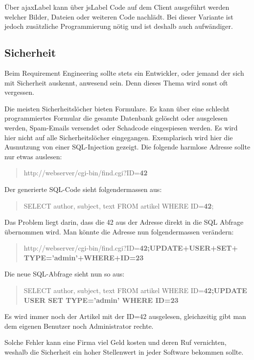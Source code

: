 Über \gls{ajaxLabel} kann über \gls{jsLabel} Code auf dem Client ausgeführt werden welcher Bilder, Dateien oder weiteren Code nachlädt. Bei dieser Variante ist jedoch zusätzliche Programmierung nötig und ist deshalb auch aufwändiger. 

\subsection{Sicherheit}
Beim Requirement Engineering sollte stets ein Entwickler, oder jemand der sich mit Sicherheit auskennt, anwesend sein. Denn dieses Thema wird sonst oft vergessen.

Die meisten Sicherheitslöcher bieten Formulare. Es kann über eine schlecht programmiertes Formular die gesamte Datenbank gelöscht oder ausgelesen werden, Spam-Emails versendet oder Schadcode eingespiesen werden.
Es wird hier nicht auf alle Sicherheitslöcher eingegangen. Exemplarisch wird hier die Ausnutzung von einer SQL-Injection gezeigt. Die folgende harmlose Adresse sollte nur etwas auslesen:

\begin{quote}
http://webserver/cgi-bin/find.cgi?ID=\textbf{42}
\end{quote}

Der generierte SQL-Code sieht folgendermassen aus:

\begin{quote}
SELECT author, subject, text FROM artikel WHERE ID=\textbf{42};
\end{quote}

Das Problem liegt darin, dass die 42 aus der Adresse direkt in die SQL Abfrage übernommen wird. Man könnte die Adresse nun folgendermassen verändern:

\begin{quote}
http://webserver/cgi-bin/find.cgi?ID=\textbf{42;UPDATE+USER+SET+\\
TYPE='admin'+WHERE+ID=23}
\end{quote}

Die neue SQL-Abfrage sieht nun so aus:


\begin{quote}
SELECT author, subject, text FROM artikel WHERE ID=\textbf{42;UPDATE USER SET TYPE='admin' WHERE ID=23}
\end{quote}

Es wird immer noch der Artikel mit der ID=42 ausgelesen, gleichzeitig gibt man dem eigenen Benutzer noch Administrator rechte.

Solche Fehler kann eine Firma viel Geld kosten und deren Ruf vernichten, weshalb die Sicherheit ein hoher Stellenwert in jeder Software bekommen sollte.